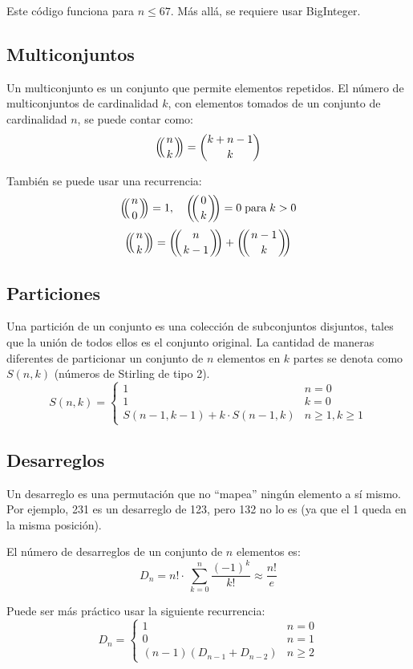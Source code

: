 \documentclass{article}
\def\multiset#1#2{\ensuremath{\left(\kern-.3em\left(\genfrac{}{}{0pt}{}{#1}{#2}\right)\kern-.3em\right)}}
\begin{document}
\begin{multicols}{2}
	Este código funciona para \( n \leq 67 \). Más allá, se requiere usar BigInteger.

	\subsection{Multiconjuntos}
	Un multiconjunto es un conjunto que permite elementos repetidos. El número de multiconjuntos de cardinalidad \( k \), con elementos tomados de un conjunto de cardinalidad \( n \), se puede contar como:
	\[ \multiset{n}{k} = \binom{k+n-1}{k} \]

	También se puede usar una recurrencia:
	\[ 
		\multiset{n}{0} = 1, \quad \multiset{0}{k} = 0 \; \textrm{para} \; k > 0 
	\]
	\[ 
		\multiset{n}{k} = \multiset{n}{k-1} + \multiset{n-1}{k} 
	\]

\subsection{Particiones}
	Una partición de un conjunto es una colección de subconjuntos disjuntos, tales que la unión de todos ellos es el conjunto original. La cantidad de maneras diferentes de particionar un conjunto de \( n \) elementos en \( k \) partes se denota como \( S(n, k) \) (números de Stirling de tipo 2).
	\[
		S(n,k) = \left \{ 
			\begin{array}{lcc}
			1 & n = 0
			\\ 1 & k = 0
			\\ S(n-1, k-1) + k \cdot S(n-1, k) & n \geq 1, k \geq 1
			\end{array}
		\right.
	\]

	\subsection{Desarreglos}
	Un desarreglo es una permutación que no ``mapea'' ningún elemento a sí mismo. Por ejemplo, 231 es un desarreglo de 123, pero 132 no lo es (ya que el 1 queda en la misma posición).

	El número de desarreglos de un conjunto de \( n \) elementos es:
	\[
		D_{n} = n! \cdot \ \sum_{k=0}^{n} \frac{(-1)^k}{k!} \approx \frac{n!}{e}
	\]

	Puede ser más práctico usar la siguiente recurrencia:
	\[
		D_{n} = \left \{ 
			\begin{array}{lcc}
				1 & n = 0
				\\ 0 & n = 1
				\\ (n-1)(D_{n-1} + D_{n-2}) & n \geq 2 
			\end{array}
		\right.
	\]
	

\end{multicols}
\end{document}
